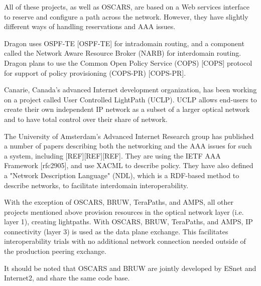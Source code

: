 \documentclass[conference]{IEEEtran}
\begin{document}
All of these projects, as well as OSCARS, are based on a Web services 
interface to reserve and configure a path across the network. However, they 
have slightly different ways of handling reservations and AAA issues.

Dragon uses OSPF-TE [OSPF-TE] for intradomain routing, and a component called
the Network Aware Resource Broker (NARB) for interdomain routing.
Dragon plans to use the Common Open Policy Service (COPS) [COPS]
protocol for support of policy provisioning (COPS-PR) [COPS-PR].

Canarie, Canada's advanced Internet development organization, has been
working on a project called User Controlled LightPath (UCLP).  UCLP
allows end-users to create their own independent IP network as a subset
of a larger optical network and to have total control over their share
of network.

The University of Amsterdam's Advanced Internet Research group has
published a number of papers
describing both the networking and the AAA issues for such a system,
including [REF][REF][REF]. They are using the IETF AAA Framework
[rfc2905], and use XACML to describe policy. They have also defined a
"Network Description Language" (NDL), which is a RDF-based method to
describe networks, to facilitate interdomain interoperability.

With the exception of OSCARS, BRUW,
TeraPaths, and AMPS, all other projects mentioned above provision resources
in the optical network layer (i.e. layer 1), creating lightpaths.
With OSCARS, BRUW, TeraPaths, and AMPS, IP connectivity (layer
3) is used as the data plane exchange.  This facilitates interoperability
trials with no additional network connection needed outside of the production
peering exchange.

It should be noted that OSCARS and BRUW are jointly developed by ESnet and 
Internet2, and share the same code base.
\end{document}
